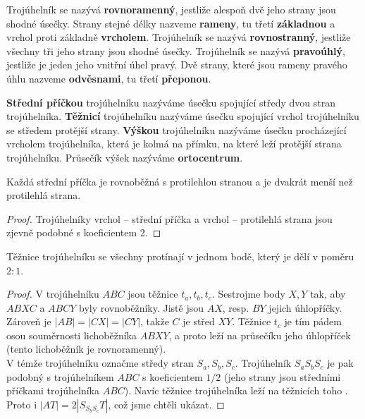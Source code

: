 \begin{definition}
  Trojúhelník se nazývá \textbf{rovnoramenný}, jestliže alespoň dvě jeho strany jsou shodné úsečky. Strany stejné délky nazveme \textbf{rameny}, tu třetí \textbf{základnou} a vrchol proti základně \textbf{vrcholem}.
  Trojúhelník se nazývá \textbf{rovnostranný}, jestliže všechny tři jeho strany jsou shodné úsečky.
  Trojúhelník se nazývá \textbf{pravoúhlý}, jestliže je jeden jeho vnitřní úhel pravý. Dvě strany, které jsou rameny pravého úhlu nazveme \textbf{odvěsnami}, tu třetí \textbf{přeponou}.
\end{definition}

\begin{definition}
  \textbf{Střední příčkou} trojúhelníku nazýváme úsečku spojující středy dvou stran trojúhelníka.
  \textbf{Těžnicí} trojúhelníku nazýváme úsečku spojující vrchol trojúhelníku se středem protější strany.
  \textbf{Výškou} trojúhelníku nazýváme úsečku procházející vrcholem trojúhelníka, která je kolmá na přímku, na které leží protější strana trojúhelníku. Průsečík výšek nazýváme \textbf{ortocentrum}.
\end{definition}

\begin{veta}
  Každá střední příčka je rovnoběžná s protilehlou stranou a je dvakrát menší než protilehlá strana.
\end{veta}

\begin{proof}
  Trojúhelníky vrchol -- střední příčka a vrchol -- protilehlá strana jsou zjevně podobné s koeficientem 2.
\end{proof}

\begin{veta}
  Těžnice trojúhelníku se všechny protínají v jednom bodě, který je dělí v poměru $2:1$.
\end{veta}

\begin{proof}
    V trojúhelníku $ABC$ jsou těžnice $t_a,t_b,t_c$. Sestrojme body $X,Y$ tak, aby
    $ABXC$ a $ABCY$ byly rovnoběžníky. Jistě jsou $AX$, resp. $BY$ jejich úhlopříčky.
    Zároveň je $|AB|=|CX|=|CY|$, takže $C$ je střed $XY$. Těžnice $t_c$ je tím pádem
    osou souměrnosti lichoběžníka $ABXY$, a proto leží na průsečíku jeho úhlopříček
    (tento lichoběžník je rovnoramenný).\\
    V témže trojúhelníku označme středy stran $S_a,S_b,S_c$. Trojúhelník $S_aS_bS_c$ je
    pak podobný s trojúhelníkem $ABC$ s koeficientem $1/2$ (jeho strany jsou středními
    příčkami trojúhelníka $ABC$). Navíc těžnice  trojúhelníka leží na
    těžnicích toho . Proto i $|AT|=2|S_{S_bS_c}T|$, což jsme chtěli ukázat.
\end{proof}

